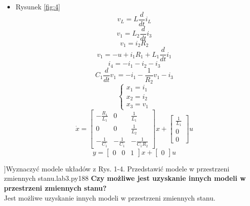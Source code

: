 \documentclass[12pt, letterpaper]{article}
\begin{document}
\begin{enumerate}
\begin{itemize}
            \item Rysunek \ref{fig:4}
                \[v_L=L\frac{d}{dt}i_L\]
                \[v_1=L_2\frac{d}{dt}i_3\]
                \[v_1=i_2R_2\]
                \[v_1=-u+i_1R_1+L_1\frac{d}{dt}i_1\]
                \[i_4=-i_1-i_2-i_3\]
                \[C_1\frac{d}{dt}v_1=-i_1-\frac{1}{R_2}v_1-i_3\]
                \[\begin{cases}
                    x_1=i_1\\
                    x_2=i_2\\
                    x_3=v_1
                \end{cases}\]
                \[\dot{x}=\begin{bmatrix}
                    -\frac{R_1}{L_1}& 0& \frac{1}{L_1}\\
                    0& 0& \frac{1}{L_2}\\
                    -\frac{1}{C_1}& -\frac{1}{C_1}& -\frac{1}{C_1R_2}
                \end{bmatrix}x+
                \begin{bmatrix}
                    \frac{1}{L_1}\\0\\0
                \end{bmatrix}u\]
                \[y=\begin{bmatrix}
                    0&0&1
                \end{bmatrix}x+
                \begin{bmatrix}
                    0
                \end{bmatrix}u\]
                
            \end{itemize}
            ]{Wyznaczyć modele układów z Rys. 1-4. Przedstawić modele w przestrzeni zmiennych
            stanu.}{lab3.py}{1}{88}
            \textbf{Czy możliwe jest uzyskanie innych modeli w przestrzeni zmiennych stanu?}\\
            Jest możliwe uzyskanie innych modeli w przestrzeni zmiennych stanu.



\end{enumerate}
\end{document}
